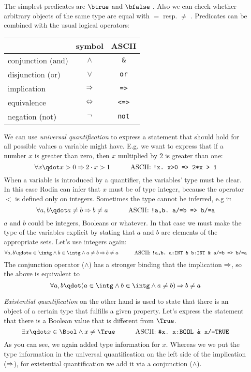 The simplest predicates are $\btrue$  and $\bfalse$ .
Also we can check whether arbitrary objects of the same type are equal with $=$ resp. $\neq$
\inascii{/=}.
Predicates can be combined with the usual logical operators:
\begin{center}
  \begin{tabular}{lcc}
                      & symbol   & ASCII \\
    \hline
    conjunction (and) & $\land$  & \texttt{\&} \\
    disjunction (or)   & $\lor$   & \texttt{or} \\
    implication       & $\mathbin\Rightarrow$  & \texttt{=>} \\
    equivalence       & $\mathbin\Leftrightarrow$  & \texttt{<=>} \\
    negation (not)    & $\lnot$  & \texttt{not} \\
  \end{tabular}
\end{center}
We can use \emph{universal quantification} to express a statement that should hold for all possible values
a variable might have. E.g. we want to express that if a number $x$ is greater than zero,
then $x$ multiplied by 2 is greater than one:
\[ \forall x \qdot x>0 \limp 2\cdot x > 1 \lascii{!x.\ x>0\ =>\ 2*x\ >\ 1}\]
When a variable is introduced by a quantifier, the variables' type must be clear.
In this case Rodin can infer that $x$ must be of type integer, because the operator $<$ 
is defined only on integers. Sometimes the type cannot be inferred, e.g in
\[ \forall a,b \qdot a\neq b \limp b\neq a \lascii{!a,b.\ a/=b\ =>\ b/=a} \]
$a$ and $b$ could be integers, Booleans or whatever.
In that case we must make the type of the variables explicit by stating that $a$ and $b$ are elements
of the appropriate sets. Let's use integers again:
\[ \forall a,b \qdot a\in\intg \land b\in\intg \land a\neq b \limp b\neq a \lascii{!a,b.\ a:INT \& b:INT \& a/=b => b/=a} \]
The conjunction operator ($\land$) has a stronger binding that the implication $\mathbin\Rightarrow$, so the above is equivalent to
\[ \forall a,b \qdot (a\in\intg \land b\in\intg \land a\neq b) \limp b\neq a\]


\emph{Existential quantification} on the other hand is used to state that there is an object of a certain type that
fulfills a given property. Let's express the statement that there is a Boolean value that is different from
$\True$.
\[ \exists x \qdot x\in\Bool \land x\neq\True \lascii{\#x.\ x:BOOL\ \&\ x/=TRUE} \]
As you can see, we again added type information for $x$. Whereas we we put the type information in the universal
quantification on the left side of the implication ($\mathbin\Rightarrow$), 
for existential quantification we add it via a conjunction ($\land$).

